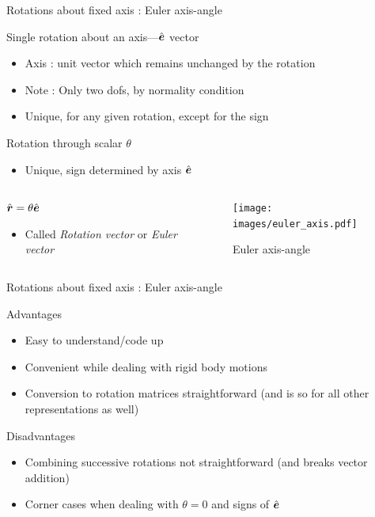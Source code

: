 \documentclass[presentation]{beamer}
\newcommand{\gv}[1]{\ensuremath{\mbox{\boldmath$ #1 $}}}
\begin{document}
\begin{frame}[label={sec:org52a80d1}]{Rotations about fixed axis : Euler axis-angle}
\begin{block}{Single rotation about an axis---\(\hat{\gv{e}}\) vector}
\begin{itemize}
\item Axis : unit vector which remains unchanged by the rotation
\item Note : Only two dofs, by normality condition
\item Unique, for any given rotation, except for the sign
\end{itemize}
\end{block}
\begin{block}{Rotation through scalar \(\theta\)}
\begin{itemize}
\item Unique, sign determined by axis \(\hat{\gv{e}}\)
\end{itemize}
\end{block}
\begin{columns}
\begin{column}{0.6\columnwidth}
\begin{block}{\(\hat{\gv{r}} = \theta \hat{\gv{e}}\)}
\begin{itemize}
\item Called \emph{Rotation vector} or \emph{Euler vector}
\end{itemize}
\end{block}
\end{column}
\begin{column}{0.3\columnwidth}
\begin{figure}[htbp]
\centering
\texttt{[image: images/euler\_axis.pdf]}
\caption{Euler axis-angle}
\end{figure}
\end{column}
\end{columns}
\end{frame}
\begin{frame}[label={sec:orgf520f10}]{Rotations about fixed axis : Euler axis-angle}
\begin{block}{Advantages}
\begin{itemize}
\item Easy to understand/code up
\item Convenient while dealing with rigid body motions
\item Conversion to rotation matrices straightforward (and is so for all other
representations as well)
\end{itemize}
\end{block}
\begin{block}{Disadvantages}
\begin{itemize}
\item Combining successive rotations not straightforward (and breaks vector addition)
\item Corner cases when dealing with \(\theta = 0\) and signs of \(\hat{\gv{e}}\)
\end{itemize}
\end{block}
\end{frame}
\end{document}
